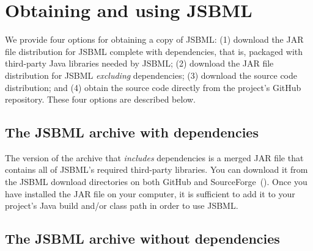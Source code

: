 
\section{Obtaining and using JSBML}
\label{sec:obtaining-jsbml}

We provide four options for obtaining a copy of JSBML: (1) download the JAR
file distribution for JSBML complete with dependencies, that is, packaged
with third-party Java libraries needed by JSBML; (2) download the JAR file
distribution for JSBML \emph{excluding} dependencies; (3) download the
source code distribution; and (4) obtain the source code directly from the
project's GitHub~\citep{JSBMLGIT} repository. These four options are described below.


\subsection{The JSBML archive with dependencies}

The version of the archive that \emph{includes} dependencies is a merged JAR file
that contains all of JSBML's required third-party libraries. You can download
it from the JSBML download directories on both GitHub and SourceForge~(\cite{JSBMLdownloadSF,
  JSBMLdownloadGitHub}). Once you have installed the
JAR file on your computer, it is sufficient to add it to your project's Java build
and/or class path in order to use JSBML.

\subsection{The JSBML archive without dependencies}

